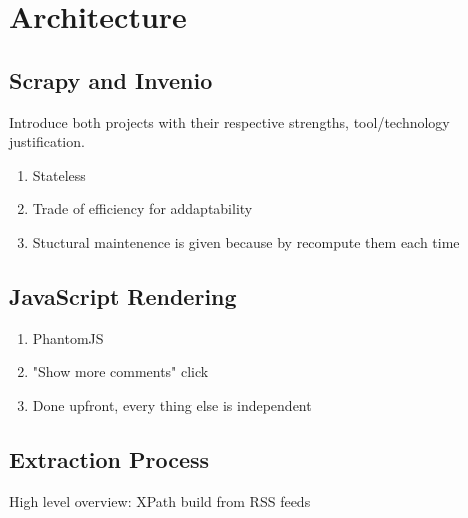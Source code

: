 \section{Architecture}

\subsection{Scrapy and Invenio}
Introduce both projects with their respective strengths, tool/technology justification.

\begin{enumerate}
  \item Stateless
  \item Trade of efficiency for addaptability
  \item Stuctural maintenence is given because by recompute them each time
\end{enumerate}

\subsection{JavaScript Rendering}
\begin{enumerate}
  \item PhantomJS
  \item "Show more comments" click
  \item Done upfront, every thing else is independent
\end{enumerate}

\subsection{Extraction Process}
High level overview: XPath build from RSS feeds
